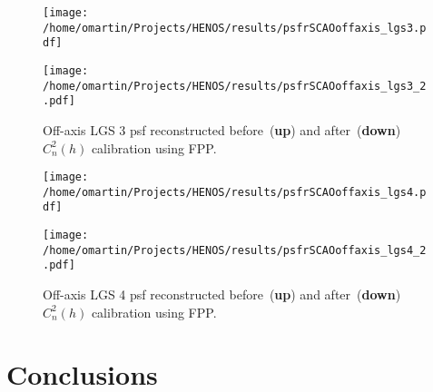 \documentclass[12pt]{article}
\newcommand{\cnh}{C_n^2(h)}
\begin{document}
\begin{figure}
	\centering
	\texttt{[image: /home/omartin/Projects/HENOS/results/psfrSCAOoffaxis\_lgs3.pdf]}
	\vspace{1cm}
	
	\texttt{[image: /home/omartin/Projects/HENOS/results/psfrSCAOoffaxis\_lgs3\_2.pdf]}
	\caption{Off-axis LGS 3 psf reconstructed before~(\textbf{up}) and after~(\textbf{down}) $\cnh$ calibration using FPP. }
	\label{F:lgs3}
\end{figure}

\begin{figure}
	\centering
	\texttt{[image: /home/omartin/Projects/HENOS/results/psfrSCAOoffaxis\_lgs4.pdf]}
	\vspace{1cm}
	
	\texttt{[image: /home/omartin/Projects/HENOS/results/psfrSCAOoffaxis\_lgs4\_2.pdf]}
	\caption{Off-axis LGS 4 psf reconstructed before~(\textbf{up}) and after~(\textbf{down}) $\cnh$ calibration using FPP. }
	\label{F:lgs4}
\end{figure}

\section{Conclusions}



 

\end{document}
